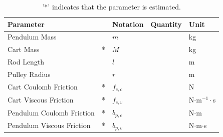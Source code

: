 \begin{table}[H]
\begin{tabular}{|lp{.4cm}|l|l|l|}
  \hline %
  \textbf{Parameter}        &   & \textbf{Notation} & \textbf{Quantity} & \textbf{Unit} \\
  \hline %
  Pendulum Mass             &   &   $m$             &                   &  kg           \\
  \hline %
  Cart Mass                 & * &   $M$             &                   &  kg           \\
  \hline %
  Rod Length                &   &   $l$             &                   &  m            \\
  \hline %
  Pulley Radius             &   &   $r$             &                   &  m            \\
  \hline %
  Cart Coulomb Friction     & * &   $f_{c,c}$       &                   &  N            \\
  \hline %
  Cart Viscous Friction     & * &   $f_{c,v}$       &                   &  N$\cdot$m$^{-1}\cdot$s \\
  \hline %
  Pendulum Coulomb Friction & * &   $b_{p,c}$       &                   &  N$\cdot$m              \\
  \hline %
  Pendulum Viscous Friction & * &   $b_{p,v}$       &                   &  N$\cdot$m$\cdot$s      \\
  \hline %
\end{tabular}
\caption{'*' indicates that the parameter is estimated.\label{table:systemParameters}}
\end{table}